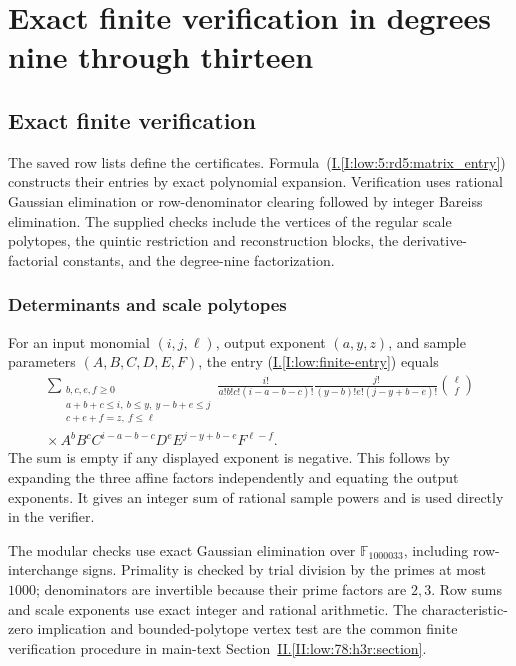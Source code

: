 \documentclass[11pt]{amsart}
\theoremstyle{definition}
\theoremstyle{remark}
\numberwithin{equation}{section}
\newcommand{\partIref}[1]{\hyperref[I:#1]{I.\ref*{I:#1}}}
\newcommand{\partIeqref}[1]{\textup{(\partIref{#1})}}
\newcommand{\partIIref}[1]{\hyperref[II:#1]{II.\ref*{II:#1}}}
\begin{document}
\section{Exact finite verification in degrees nine through thirteen}

\subsection{Exact finite verification}\label{low:verification-method}
The saved row lists define the certificates. Formula~\partIeqref{low:5:rd5:matrix_entry} constructs their entries by exact polynomial expansion. Verification uses rational Gaussian elimination or row-denominator clearing followed by integer Bareiss elimination. The supplied checks include the vertices of the regular scale polytopes, the quintic restriction and reconstruction blocks, the derivative-factorial constants, and the degree-nine factorization.

\subsubsection{Determinants and scale polytopes}
For an input monomial $(i,j,\ell)$, output exponent $(a,y,z)$, and sample parameters $(A,B,C,D,E,F)$, the entry \partIeqref{low:finite-entry} equals
\[
\begin{multlined}
\sum_{\substack{b,c,e,f\ge0\\a+b+c\le i,\ b\le y,\ y-b+e\le j\\c+e+f=z,\ f\le\ell}}
\frac{i!}{a!b!c!(i-a-b-c)!}
\frac{j!}{(y-b)!e!(j-y+b-e)!}
\binom{\ell}{f}\\
{}\times
A^bB^cC^{i-a-b-c}D^eE^{j-y+b-e}F^{\ell-f}.
\end{multlined}
\]
The sum is empty if any displayed exponent is negative. This follows by expanding the three affine factors independently and equating the output exponents. It gives an integer sum of rational sample powers and is used directly in the verifier.

The modular checks use exact Gaussian elimination over $\mathbb F_{1000033}$, including row-interchange signs. Primality is checked by trial division by the primes at most $1000$; denominators are invertible because their prime factors are $2,3$. Row sums and scale exponents use exact integer and rational arithmetic. The characteristic-zero implication and bounded-polytope vertex test are the common finite verification procedure in main-text Section~\partIIref{low:78:h3r:section}.
\end{document}
